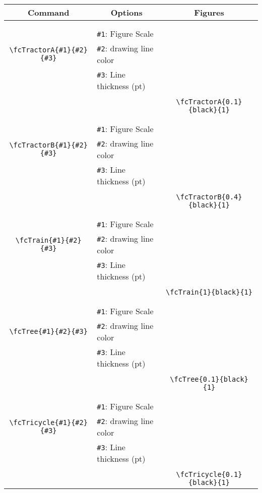 \documentclass[x11names]{article}
\begin{document}
\begin{table}[H]\centering\begin{tabular}{|c|l|c|}\hline {\bf Command}& \multicolumn{1}{c|}{{\bf Options}} & {\bf Figures}\\  \hline	&&\multirow{5}{*}{\fcTractorA{0.1}{black}{1}}\\	&&\\	&\verb|#1|: Figure Scale &\\	\verb|\fcTractorA{#1}{#2}{#3}|&	\verb|#2|: drawing line color &\\	&\verb|#3|: Line thickness (pt) &\\ &&\\&&	\verb|\fcTractorA{0.1}{black}{1}|\\\hline 	
	&&\multirow{5}{*}{\fcTractorB{0.4}{black}{1}}\\	&&\\	&\verb|#1|: Figure Scale &\\	\verb|\fcTractorB{#1}{#2}{#3}|&	\verb|#2|: drawing line color &\\	&\verb|#3|: Line thickness (pt) &\\ &&\\&&	\verb|\fcTractorB{0.4}{black}{1}|\\\hline 	
	&&\multirow{5}{*}{\fcTrain{1}{black}{1}}\\	&&\\	&\verb|#1|: Figure Scale &\\	\verb|\fcTrain{#1}{#2}{#3}|&	\verb|#2|: drawing line color &\\	&\verb|#3|: Line thickness (pt) &\\ &&\\&&	\verb|\fcTrain{1}{black}{1}|\\\hline 	
	&&\multirow{5}{*}{\fcTree{0.1}{black}{1}}\\	&&\\	&\verb|#1|: Figure Scale &\\	\verb|\fcTree{#1}{#2}{#3}|&	\verb|#2|: drawing line color &\\	&\verb|#3|: Line thickness (pt) &\\ &&\\&&	\verb|\fcTree{0.1}{black}{1}|\\\hline 	
	&&\multirow{5}{*}{\fcTricycle{0.1}{black}{1}}\\	&&\\	&\verb|#1|: Figure Scale &\\	\verb|\fcTricycle{#1}{#2}{#3}|&	\verb|#2|: drawing line color &\\	&\verb|#3|: Line thickness (pt) &\\ &&\\&&	\verb|\fcTricycle{0.1}{black}{1}|\\\hline 	

\end{tabular}
\end{table}
\end{document}
